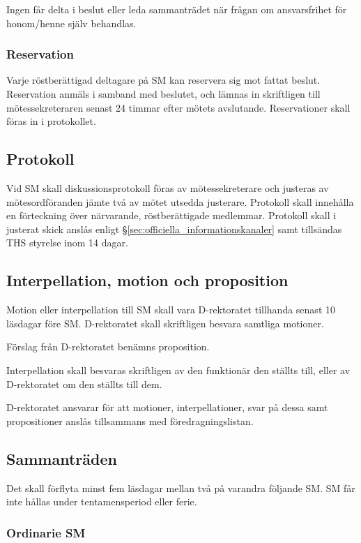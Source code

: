 \documentclass{dgovdoc}
\begin{document}
Ingen får delta i beslut eller leda sammanträdet när frågan om ansvarsfrihet
för honom/henne själv behandlas.

\subsubsection{Reservation}

Varje röstberättigad deltagare på SM kan reservera sig mot fattat beslut.
Reservation anmäls i samband med beslutet, och lämnas in skriftligen till
mötessekreteraren senast 24 timmar efter mötets avslutande. Reservationer skall
föras in i protokollet.

\subsection{Protokoll}

Vid SM skall diskussionsprotokoll föras av mötessekreterare och justeras av
mötesordföranden jämte två av mötet utsedda justerare. Protokoll skall
innehålla en förteckning över närvarande, röstberättigade medlemmar. Protokoll
skall i justerat skick anslås enligt \S\ref{sec:officiella_informationskanaler}
samt tillsändas THS styrelse inom 14 dagar.

\subsection{Interpellation, motion och proposition}

Motion eller interpellation till SM skall vara D-rektoratet tillhanda senast 10
läsdagar före SM. D-rektoratet skall skriftligen besvara samtliga motioner.

Förslag från D-rektoratet benämns proposition.

Interpellation skall besvaras skriftligen av den funktionär den ställts till,
eller av D-rektoratet om den ställts till dem.

D-rektoratet ansvarar för att motioner, interpellationer, svar på dessa samt
propositioner anslås tillsammans med föredragningslistan.

\subsection{Sammanträden}

Det skall förflyta minst fem läsdagar mellan två på varandra följande SM. SM
får inte hållas under tentamensperiod eller ferie.

\subsubsection{Ordinarie SM}
\label{sec:ordinarie_sm}
\end{document}
